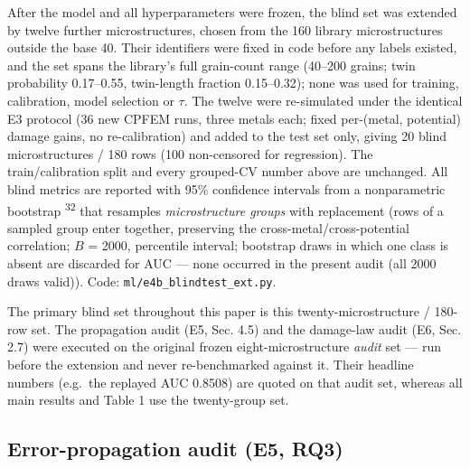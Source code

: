 \documentclass[11pt]{article}
\begin{document}
After the model and all hyperparameters were frozen, the blind set was extended by twelve further microstructures, chosen from the 160 library microstructures outside the base 40. Their identifiers were fixed in code before any labels existed, and the set spans the library's full grain-count range (40--200 grains; twin probability 0.17--0.55, twin-length fraction 0.15--0.32); none was used for training, calibration, model selection or $\tau$. The twelve were re-simulated under the identical E3 protocol (36 new CPFEM runs, three metals each; fixed per-(metal, potential) damage gains, no re-calibration) and added to the test set only, giving 20 blind microstructures / 180 rows (100 non-censored for regression). The train/calibration split and every grouped-CV number above are unchanged. All blind metrics are reported with 95\% confidence intervals from a nonparametric bootstrap \textsuperscript{32} that resamples \textit{microstructure groups} with replacement (rows of a sampled group enter together, preserving the cross-metal/cross-potential correlation; $B$ = 2000, percentile interval; bootstrap draws in which one class is absent are discarded for AUC --- none occurred in the present audit (all 2000 draws valid)). Code: \texttt{ml/e4b\_blindtest\_ext.py}.

The primary blind set throughout this paper is this twenty-microstructure / 180-row set. The propagation audit (E5, Sec. 4.5) and the damage-law audit (E6, Sec. 2.7) were executed on the original frozen eight-microstructure \textit{audit} set --- run before the extension and never re-benchmarked against it. Their headline numbers (e.g.\ the replayed AUC 0.8508) are quoted on that audit set, whereas all main results and Table 1 use the twenty-group set.

\subsection{Error-propagation audit (E5, RQ3)}
\end{document}
